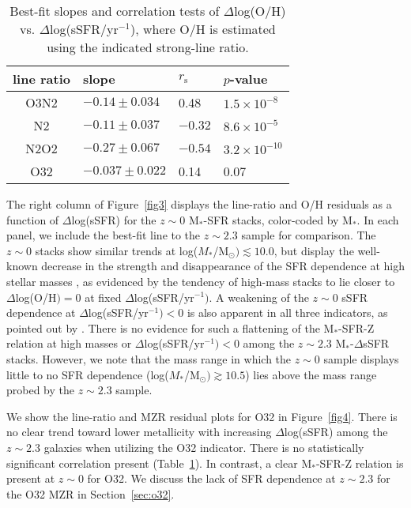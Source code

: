 \documentclass[iop,twocolappendix]{emulateapj}
\newcommand{\mstar}{$\mbox{M}_*$}
\begin{document}
\begin{table}[t]
 \centering
 \caption{Best-fit slopes and correlation tests of $\Delta$log(O/H) vs. $\Delta$log(sSFR/yr$^{-1}$), where O/H is estimated using the indicated strong-line ratio.}\label{tab:slopes}
 \begin{tabular}{ c l l l }
   \hline\hline
   line ratio & slope & $r_\text{s}$\tablenotemark{a} & $p$-value\tablenotemark{b} \\ \hline
   O3N2 & $-0.14\pm0.034$ & 0.48 & $1.5\times10^{-8}$ \\
   N2 & $-0.11\pm0.037$ & $-0.32$ & $8.6\times10^{-5}$ \\
   N2O2 & $-0.27\pm0.067$ & $-0.54$ & $3.2\times10^{-10}$ \\
   O32 & $-0.037\pm0.022$ & 0.14 & 0.07 \\
   \hline\hline
 \end{tabular}
\end{table}

The right column of Figure~\ref{fig3} displays the line-ratio and O/H residuals as a function of
 $\Delta$log(sSFR) for the $z\sim0$ \mstar-SFR stacks, color-coded by \mstar.
  In each panel, we include the best-fit line to the $z\sim2.3$ sample for comparison.
  The $z\sim0$ stacks show similar trends at log($M_*$/M$_{\odot})\lesssim10.0$,
 but display the well-known decrease in the strength and disappearance of the
 SFR dependence at high stellar masses \citep{man10,yat12,sal14}, 
 as evidenced by the tendency of high-mass stacks to lie closer to $\Delta$log(O/H$)=0$ at fixed
 $\Delta$log(sSFR/yr$^{-1})$.
  A weakening of the $z\sim0$ sSFR dependence at $\Delta$log(sSFR/yr$^{-1})<0$ is also apparent
 in all three indicators, as pointed out by \citet{sal14}.
  There is no evidence for such a flattening of the \mstar-SFR-Z relation
 at high masses or $\Delta$log(sSFR/yr$^{-1})<0$ among the $z\sim2.3$ \mstar-$\Delta$sSFR stacks.
  However, we note that the mass range in which the $z\sim0$ sample displays little to no SFR dependence
 (log($M_*$/M$_{\odot})\gtrsim10.5$) lies above the mass range probed by the $z\sim2.3$ sample.

We show the line-ratio and MZR residual plots for O32 in Figure~\ref{fig4}.
  There is no clear trend toward lower metallicity with increasing $\Delta$log(sSFR)
 among the $z\sim2.3$ galaxies when utilizing the O32 indicator.
  There is no statistically significant correlation present (Table~\ref{tab:slopes}).
  In contrast, a clear \mstar-SFR-Z relation is present at $z\sim0$ for O32.
  We discuss the lack of SFR dependence at $z\sim2.3$ for the O32 MZR in Section~\ref{sec:o32}.
\end{document}
